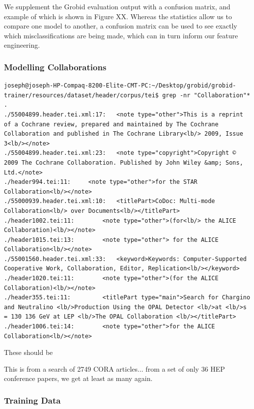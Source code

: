 \documentclass[11pt, oneside]{scrartcl}   	%
\begin{document}
We supplement the Grobid evaluation output with a confusion matrix, and example of which is shown in Figure XX. Whereas the statistics allow us to compare one model to another, a confusion matrix can be used to see exactly which misclassifications are being made, which can in turn inform our feature engineering.

\subsubsection{Modelling Collaborations}

\begin{verbatim}
joseph@joseph-HP-Compaq-8200-Elite-CMT-PC:~/Desktop/grobid/grobid-trainer/resources/dataset/header/corpus/tei$ grep -nr "Collaboration"* .
./55004899.header.tei.xml:17:	<note type="other">This is a reprint of a Cochrane review, prepared and maintained by The Cochrane Collaboration and published in The Cochrane Library<lb/> 2009, Issue 3<lb/></note>
./55004899.header.tei.xml:23:	<note type="copyright">Copyright © 2009 The Cochrane Collaboration. Published by John Wiley &amp; Sons, Ltd.</note>
./header994.tei:11:		<note type="other">for the STAR Collaboration<lb/></note>
./55000939.header.tei.xml:10:	<titlePart>CoDoc: Multi-mode Collaboration<lb/> over Documents<lb/></titlePart>
./header1002.tei:11:		<note type="other">(for<lb/> the ALICE Collaboration)<lb/></note>
./header1015.tei:13:		<note type="other"> for the ALICE Collaboration<lb/></note>
./55001560.header.tei.xml:33:	<keyword>Keywords: Computer-Supported Cooperative Work, Collaboration, Editor, Replication<lb/></keyword>
./header1020.tei:11:		<note type="other">(for the ALICE Collaboration)<lb/></note>
./header355.tei:11:			<titlePart type="main">Search for Chargino and Neutralino <lb/>Production Using the OPAL Detector <lb/>at <lb/>s = 130 136 GeV at LEP <lb/>The OPAL Collaboration <lb/></titlePart>
./header1006.tei:14:		<note type="other">for the ALICE Collaboration<lb/></note>
\end{verbatim}

These should be 

This is from a search of 2749 CORA articles... from a set of only  36 HEP conference papers, we get at least as many again.

\subsubsection{Training Data}
\end{document}

